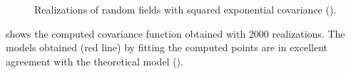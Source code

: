 \begin{figure}[H]
 \caption{Realizations of random fields with squared exponential covariance ().}
 \label{fig-condFields}
\end{figure}

 shows the computed covariance function obtained with 2000 realizations. 
The models obtained (red line) by fitting the computed points are in excellent agreement with the theoretical model ().

